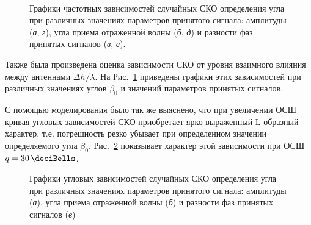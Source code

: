 \documentclass[../main.tex]{subfiles}
\begin{document}
\begin{figure}[tb]
  \centering
  \\

  \caption{Графики частотных зависимостей случайных СКО определения угла при различных значениях параметров принятого сигнала: амплитуды (\textit{а}, \textit{г}), угла приема отраженной волны (\textit{б}, \textit{д}) и разности фаз принятых сигналов (\textit{в}, \textit{е}).}
  \label{fig:surface:pic3}
\end{figure}

Также была произведена оценка зависимости СКО от уровня взаимного влияния между антеннами $\Delta h^{}/\lambda$. На Рис.~\ref{fig:surface:pic3} приведены графики этих зависимостей при различных значениях углов $\beta_0$ и значений параметров принятых сигналов.

С помощью моделирования было так же выяснено, что при увеличении ОСШ кривая угловых зависимостей СКО приобретает ярко выраженный L-образный характер, т.е. погрешность резко убывает при определенном значении определяемого угла $\beta_0$. Рис.~\ref{fig:surface:pic4} показывает характер этой зависимости при ОСШ $q = \SI{30}{\deciBells}$.

\begin{figure}[hpbt]
  \centering

  \caption{Графики угловых зависимостей случайных СКО определения угла при различных значениях параметров принятого сигнала: амплитуды (\textit{а}), угла приема отраженной волны (\textit{б}) и разности фаз принятых сигналов (\textit{в})}
  \label{fig:surface:pic4}
\end{figure}
\end{document}
